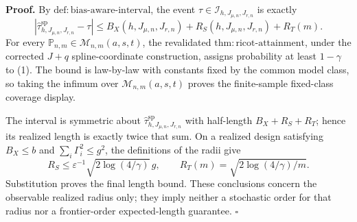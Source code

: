 \textbf{Proof.}
By \(\mathrm{def:bias\text{-}aware\text{-}interval}\), the event \(\tau\in\mathcal I_{h,J_{\mu,n},J_{r,n}}\) is exactly
\[
\left|\widehat\tau^{\mathrm{sp}}_{h,J_{\mu,n},J_{r,n}}-\tau\right|
\le B_X(h,J_{\mu,n},J_{r,n})+R_S(h,J_{\mu,n},J_{r,n})+R_T(m).
\tag{1}
\]
For every \(\mathbb P_{n,m}\in\mathcal M_{n,m}(a,s,t)\), the revalidated \(\mathrm{thm:ricot\text{-}attainment}\), under the corrected \(J+q\) spline-coordinate construction, assigns probability at least \(1-\gamma\) to (1). The bound is law-by-law with constants fixed by the common model class, so taking the infimum over \(\mathcal M_{n,m}(a,s,t)\) proves the finite-sample fixed-class coverage display.

The interval is symmetric about \(\widehat\tau^{\mathrm{sp}}_{h,J_{\mu,n},J_{r,n}}\) with half-length \(B_X+R_S+R_T\); hence its realized length is exactly twice that sum. On a realized design satisfying \(B_X\le b\) and \(\sum_i\Gamma_i^2\le g^2\), the definitions of the radii give
\[
R_S\le\varepsilon^{-1}\sqrt{2\log(4/\gamma)}\,g,
\qquad
R_T(m)=\sqrt{2\log(4/\gamma)/m}.
\]
Substitution proves the final length bound. These conclusions concern the observable realized radius only; they imply neither a stochastic order for that radius nor a frontier-order expected-length guarantee. \(\square\)